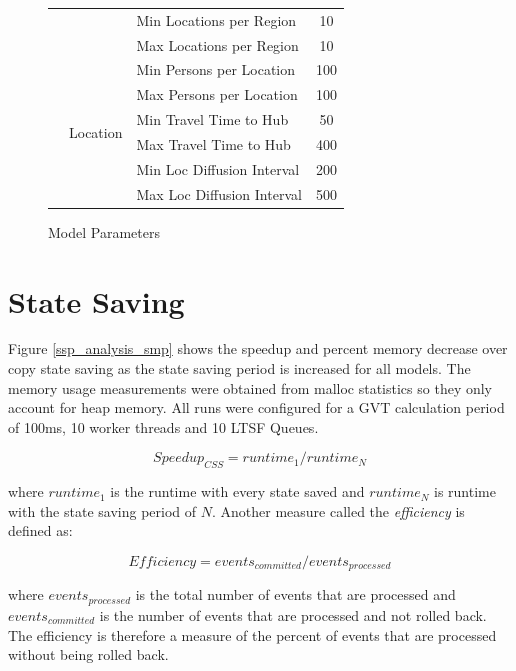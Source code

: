 \documentclass[11pt]{book}
\begin{document}
\begin{figure}
\begin{center}
\begin{tabular}{|| c | l | l | c ||}
                &                               & Min Locations per Region  & 10    \\
                &                               & Max Locations per Region  & 10    \\ \cline{2-4}
                & \multirow{6}{*}{Location}     & Min Persons per Location  & 100   \\
                &                               & Max Persons per Location  & 100   \\
                &                               & Min Travel Time to Hub    & 50    \\
                &                               & Max Travel Time to Hub    & 400   \\
                &                               & Min Loc Diffusion Interval& 200   \\
                &                               & Max Loc Diffusion Interval& 500   \\
            \hline
        \end{tabular}
        \caption{Model Parameters}\label{model_params}
    \end{center}
\end{figure}

\section{State Saving}\label{ssp_analysis}

Figure \ref{ssp_analysis_smp} shows the speedup and percent memory decrease over copy state saving
as the state saving period is increased for all models. The memory usage measurements were obtained
from malloc statistics so they only account for heap memory.  All runs were configured for a GVT
calculation period of 100ms, 10 worker threads and 10 LTSF Queues.

$$ Speedup_{CSS} = runtime_{1}/runtime_{N} $$

\noindent
where $runtime_{1}$ is the runtime with every state saved and $runtime_{N}$ is runtime with the
state saving period of $N$. Another measure called the \emph{efficiency} is defined as:

$$ Efficiency = {events_{committed}}/{events_{processed}} $$

\noindent
where $events_{processed}$ is the total number of events that are processed and $events_{committed}$
is the number of events that are processed and not rolled back. The efficiency is therefore
a measure of the percent of events that are processed without being rolled back.
\end{document}
